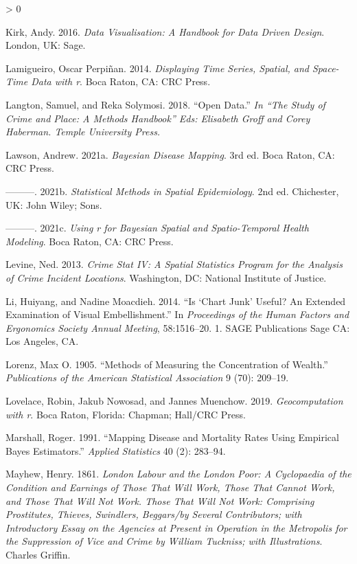 \documentclass[
  krantz2]{krantz}
\newlength{\cslhangindent}
\newenvironment{CSLReferences}[2] %
 {%
  \setlength{\parindent}{0pt}
  \ifodd #1 \everypar{\setlength{\hangindent}{\cslhangindent}}\ignorespaces\fi
  \ifnum #2 > 0
  \setlength{\parskip}{#2\baselineskip}
  \fi
 }%
 {}
\begin{document}
\begin{CSLReferences}{1}{0}
\leavevmode\hypertarget{ref-Kirk_2016}{}%
Kirk, Andy. 2016. \emph{Data Visualisation: A Handbook for Data Driven Design}. London, UK: Sage.

\leavevmode\hypertarget{ref-Perpinan_2014}{}%
Lamigueiro, Oscar Perpiñan. 2014. \emph{Displaying Time Series, Spatial, and Space-Time Data with r}. Boca Raton, CA: CRC Press.

\leavevmode\hypertarget{ref-Langton_2018}{}%
Langton, Samuel, and Reka Solymosi. 2018. {``Open Data.''} \emph{In {``The Study of Crime and Place: A Methods Handbook''} Eds: Elisabeth Groff and Corey Haberman. Temple University Press.}

\leavevmode\hypertarget{ref-Lawson_2021a}{}%
Lawson, Andrew. 2021a. \emph{Bayesian Disease Mapping}. 3rd ed. Boca Raton, CA: CRC Press.

\leavevmode\hypertarget{ref-Lawson_2006}{}%
---------. 2021b. \emph{Statistical Methods in Spatial Epidemiology}. 2nd ed. Chichester, UK: John Wiley; Sons.

\leavevmode\hypertarget{ref-Lawson_2021b}{}%
---------. 2021c. \emph{Using r for Bayesian Spatial and Spatio-Temporal Health Modeling}. Boca Raton, CA: CRC Press.

\leavevmode\hypertarget{ref-Levine_2013}{}%
Levine, Ned. 2013. \emph{Crime Stat IV: A Spatial Statistics Program for the Analysis of Crime Incident Locations}. Washington, DC: National Institute of Justice.

\leavevmode\hypertarget{ref-Li_2014}{}%
Li, Huiyang, and Nadine Moacdieh. 2014. {``Is {`Chart Junk'} Useful? An Extended Examination of Visual Embellishment.''} In \emph{Proceedings of the Human Factors and Ergonomics Society Annual Meeting}, 58:1516--20. 1. SAGE Publications Sage CA: Los Angeles, CA.

\leavevmode\hypertarget{ref-lorenz1905methods}{}%
Lorenz, Max O. 1905. {``Methods of Measuring the Concentration of Wealth.''} \emph{Publications of the American Statistical Association} 9 (70): 209--19.

\leavevmode\hypertarget{ref-Lovelace_2019}{}%
Lovelace, Robin, Jakub Nowosad, and Jannes Muenchow. 2019. \emph{Geocomputation with r}. Boca Raton, Florida: Chapman; Hall/CRC Press.

\leavevmode\hypertarget{ref-Marshall_1991}{}%
Marshall, Roger. 1991. {``Mapping Disease and Mortality Rates Using Empirical Bayes Estimators.''} \emph{Applied Statistics} 40 (2): 283--94.

\leavevmode\hypertarget{ref-Mayhew_1861}{}%
Mayhew, Henry. 1861. \emph{London Labour and the London Poor: A Cyclopaedia of the Condition and Earnings of Those That Will Work, Those That Cannot Work, and Those That Will Not Work. Those That Will Not Work: Comprising Prostitutes, Thieves, Swindlers, Beggars/by Several Contributors; with Introductory Essay on the Agencies at Present in Operation in the Metropolis for the Suppression of Vice and Crime by William Tuckniss; with Illustrations}. Charles Griffin.


\end{CSLReferences}
\end{document}
